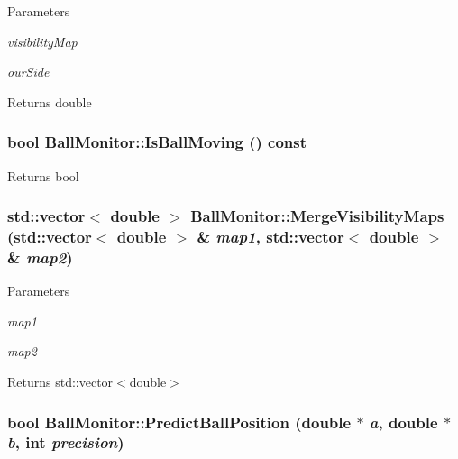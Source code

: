 \begin{DoxyParams}{Parameters}
\item[{\em visibilityMap}]\item[{\em ourSide}]\end{DoxyParams}
\begin{DoxyReturn}{Returns}
double 
\end{DoxyReturn}
\hypertarget{classBallMonitor_a8995e71b82d80987984dd6b1ed89c0a0}{
\subsubsection[{IsBallMoving}]{\setlength{\rightskip}{0pt plus 5cm}bool BallMonitor::IsBallMoving () const}}
\label{classBallMonitor_a8995e71b82d80987984dd6b1ed89c0a0}
\begin{DoxyReturn}{Returns}
bool 
\end{DoxyReturn}
\hypertarget{classBallMonitor_a74f8a1ce881528e475269fa1c964fa61}{
\subsubsection[{MergeVisibilityMaps}]{\setlength{\rightskip}{0pt plus 5cm}std::vector$<$ double $>$ BallMonitor::MergeVisibilityMaps (std::vector$<$ double $>$ \& {\em map1}, \/  std::vector$<$ double $>$ \& {\em map2})}}
\label{classBallMonitor_a74f8a1ce881528e475269fa1c964fa61}

\begin{DoxyParams}{Parameters}
\item[{\em map1}]\item[{\em map2}]\end{DoxyParams}
\begin{DoxyReturn}{Returns}
std::vector$<$double$>$ 
\end{DoxyReturn}
\hypertarget{classBallMonitor_a914053314023ea79ee691a3031e355bf}{
\subsubsection[{PredictBallPosition}]{\setlength{\rightskip}{0pt plus 5cm}bool BallMonitor::PredictBallPosition (double $\ast$ {\em a}, \/  double $\ast$ {\em b}, \/  int {\em precision})}}
\label{classBallMonitor_a914053314023ea79ee691a3031e355bf}

